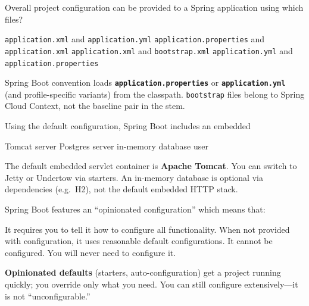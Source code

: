 


\question[4]
Overall project configuration can be provided to a Spring application using which files?
\begin{choices}
  \choice \texttt{application.xml} and \texttt{application.yml}
  \choice \texttt{application.properties} and \texttt{application.xml}
  \choice \texttt{application.xml} and \texttt{bootstrap.xml}
  \CorrectChoice \texttt{application.yml} and \texttt{application.properties}
\end{choices}
\begin{solution}
  Spring Boot convention loads \textbf{\texttt{application.properties}} or \textbf{\texttt{application.yml}} (and profile-specific variants) from the classpath. \texttt{bootstrap} files belong to Spring Cloud Context, not the baseline pair in the stem.
\end{solution}

\question[4]
Using the default configuration, Spring Boot includes an embedded
\begin{choices}
  \CorrectChoice Tomcat server
  \choice Postgres server
  \choice in-memory database
  \choice user
\end{choices}
\begin{solution}
  The default embedded servlet container is \textbf{Apache Tomcat}. You can switch to Jetty or Undertow via starters. An in-memory database is optional via dependencies (e.g.\ H2), not the default embedded HTTP stack.
\end{solution}

\question[4]
Spring Boot features an ``opinionated configuration'' which means that:
\begin{choices}
  \choice It requires you to tell it how to configure all functionality.
  \CorrectChoice When not provided with configuration, it uses reasonable default configurations.
  \choice It cannot be configured.
  \choice You will never need to configure it.
\end{choices}
\begin{solution}
  \textbf{Opinionated defaults} (starters, auto-configuration) get a project running quickly; you override only what you need. You can still configure extensively---it is not ``unconfigurable.''
\end{solution}


